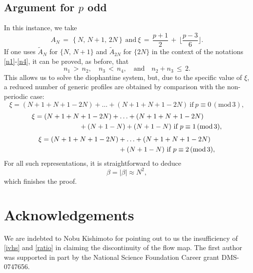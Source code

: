 \documentclass{amsart}
\begin{document}
\subsection{Argument for $p$ odd} In this instance, we take
\[
A_N\,=\,\left\{N,\, N+1, \, 2N\right\}\ \text{and} \ \xi\,=\,\frac{p+1}{2}\,+\, \lfloor\frac{p-3}{6}\rfloor.
\]
If one uses $\tilde{A}_N$ for $\{N,\,N+1\}$ and $\tilde{A}_{2N}$ for $\{2N\}$ in the context of the notations \eqref{n1}-\eqref{n4}, it can be proved, as before, that
\[
n_1\,>\,n_2, \quad n_3\,<\,n_4, \quad \text{and} \quad n_2+n_3\, \leq\, 2.\]
This allows us to solve the diophantine system, but, due to the specific value of $\xi$, a reduced number of generic profiles are obtained by comparison with the non-periodic case:
\begin{equation}
\xi=(N+1+N+1-2N)+\ldots+(N+1+N+1-2N) \ \text{if}\ p\equiv 0\, (\text{mod}\,3),
\label{0mod3p}
\end{equation}
\begin{equation}
\aligned
\xi= (N+1+N&+1-2N)+\ldots+(N+1+N+1-2N)\\
&+(N+1-N)+(N+1-N) \ \text{if}\ p\equiv 1\, (\text{mod}\,3),
\endaligned
\label{1mod3p}
\end{equation}
\begin{equation}
\aligned
\xi= (N+1+N+1-2N)&+\ldots+(N+1+N+1-2N)\\
&+(N+1-N) \ \text{if}\ p\equiv 2\, (\text{mod}\,3), 
\endaligned
\label{2mod3p}
\end{equation}
For all such representations, it is straightforward to deduce
\[
\beta= |\beta| \approx N^2,
\]
which finishes the proof.

\section*{Acknowledgements}
We are indebted to Nobu Kishimoto for pointing out to us the insufficiency of \eqref{ivhs} and \eqref{ratio} in claiming the discontinuity of the flow map. The first author was supported in part by the National Science Foundation Career grant DMS-0747656. 
\end{document}

